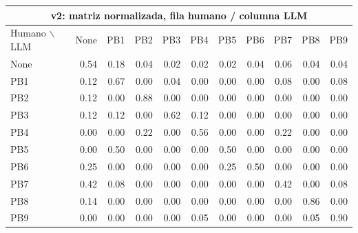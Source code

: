\begin{center}
\tiny
\setlength{\tabcolsep}{2.4pt}
\renewcommand{\arraystretch}{1.05}
\begin{tabular}{lrrrrrrrrrr}
\toprule
\multicolumn{11}{c}{\textbf{v2: matriz normalizada, fila humano / columna LLM}} \\
\midrule
Humano $\backslash$ LLM & None & PB1 & PB2 & PB3 & PB4 & PB5 & PB6 & PB7 & PB8 & PB9 \\
\midrule
None & 0.54 & 0.18 & 0.04 & 0.02 & 0.02 & 0.02 & 0.04 & 0.06 & 0.04 & 0.04 \\
PB1  & 0.12 & 0.67 & 0.00 & 0.04 & 0.00 & 0.00 & 0.00 & 0.08 & 0.00 & 0.08 \\
PB2  & 0.12 & 0.00 & 0.88 & 0.00 & 0.00 & 0.00 & 0.00 & 0.00 & 0.00 & 0.00 \\
PB3  & 0.12 & 0.12 & 0.00 & 0.62 & 0.12 & 0.00 & 0.00 & 0.00 & 0.00 & 0.00 \\
PB4  & 0.00 & 0.00 & 0.22 & 0.00 & 0.56 & 0.00 & 0.00 & 0.22 & 0.00 & 0.00 \\
PB5  & 0.00 & 0.50 & 0.00 & 0.00 & 0.00 & 0.50 & 0.00 & 0.00 & 0.00 & 0.00 \\
PB6  & 0.25 & 0.00 & 0.00 & 0.00 & 0.00 & 0.25 & 0.50 & 0.00 & 0.00 & 0.00 \\
PB7  & 0.42 & 0.08 & 0.00 & 0.00 & 0.00 & 0.00 & 0.00 & 0.42 & 0.00 & 0.08 \\
PB8  & 0.14 & 0.00 & 0.00 & 0.00 & 0.00 & 0.00 & 0.00 & 0.00 & 0.86 & 0.00 \\
PB9  & 0.00 & 0.00 & 0.00 & 0.00 & 0.05 & 0.00 & 0.00 & 0.00 & 0.05 & 0.90 \\
\bottomrule
\end{tabular}
\end{center}

